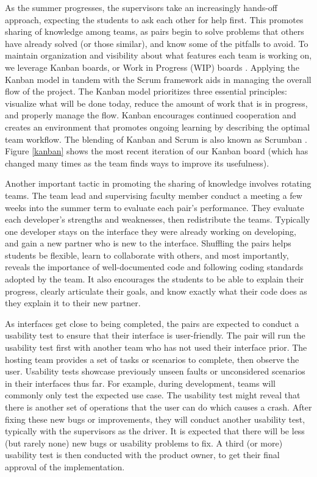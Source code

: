 As the summer progresses, the supervisors take an increasingly hands-off approach, expecting the students to ask each other for help first. This promotes sharing of knowledge among teams, as pairs begin to solve problems that others have already solved (or those similar), and know some of the pitfalls to avoid. To maintain organization and visibility about what features each team is working on, we leverage Kanban boards, or Work in Progress (WIP) boards \cite{anderson2010kanban}. Applying the Kanban model in tandem with the Scrum framework aids in managing the overall flow of the project. The Kanban model prioritizes three essential principles: visualize what will be done today, reduce the amount of work that is in progress, and properly manage the flow. Kanban encourages continued cooperation and creates an environment that promotes ongoing learning by describing the optimal team workflow. The blending of Kanban and Scrum is also known as Scrumban \cite{ladas2009scrumban}. Figure \ref{kanban} shows the most recent iteration of our Kanban board (which has changed many times as the team finds ways to improve its usefulness).

Another important tactic in promoting the sharing of knowledge involves rotating teams. The team lead and supervising faculty member conduct a meeting a few weeks into the summer term to evaluate each pair's performance. They evaluate each developer's strengths and weaknesses, then redistribute the teams. Typically one developer stays on the interface they were already working on developing, and gain a new partner who is new to the interface. Shuffling the pairs helps students be flexible, learn to collaborate with others, and most importantly, reveals the importance of well-documented code and following coding standards adopted by the team. It also encourages the students to be able to explain their progress, clearly articulate their goals, and know exactly what their code does as they explain it to their new partner.

As interfaces get close to being completed, the pairs are expected to conduct a usability test \cite{usabilitytesting} to ensure that their interface is user-friendly. The pair will run the usability test first with another team who has not used their interface prior. The hosting team provides a set of tasks or scenarios to complete, then observe the user. Usability tests showcase previously unseen faults or unconsidered scenarios in their interfaces thus far. For example, during development, teams will commonly only test the expected use case. The usability test might reveal that there is another set of operations that the user can do which causes a crash. After fixing these new bugs or improvements, they will conduct another usability test, typically with the supervisors as the driver. It is expected that there will be less (but rarely none) new bugs or usability problems to fix. A third (or more) usability test is then conducted with the product owner, to get their final approval of the implementation.

